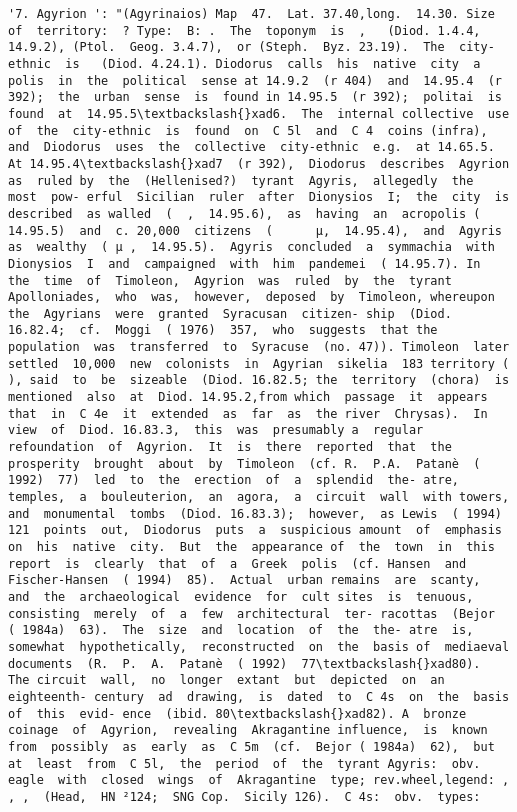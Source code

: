 \documentclass[11pt]{article}
\begin{document}
\begin{Verbatim}[commandchars=\\\{\}]
         '7. Agyrion ': "(Agyrinaios) Map  47.  Lat. 37.40,long.  14.30. Size of  territory:  ? Type:  B: .  The  toponym  is  ,   (Diod. 1.4.4,  14.9.2), (Ptol.  Geog. 3.4.7),  or (Steph.  Byz. 23.19).  The  city-ethnic  is   (Diod. 4.24.1). Diodorus  calls  his  native  city  a  polis  in  the  political  sense at 14.9.2  (r 404)  and  14.95.4  (r 392);  the  urban  sense  is  found in 14.95.5  (r 392);  politai  is  found  at  14.95.5\textbackslash{}xad6.  The  internal collective  use  of  the  city-ethnic  is  found  on  C 5l  and  C 4  coins (infra),  and  Diodorus  uses  the  collective  city-ethnic  e.g.  at 14.65.5. At 14.95.4\textbackslash{}xad7  (r 392),  Diodorus  describes  Agyrion  as  ruled by  the  (Hellenised?)  tyrant  Agyris,  allegedly  the  most  pow- erful  Sicilian  ruler  after  Dionysios  I;  the  city  is  described  as walled  (  ,  14.95.6),  as  having  an  acropolis ( 14.95.5)  and  c. 20,000  citizens  (      µ,  14.95.4),  and  Agyris  as  wealthy  ( µ ,  14.95.5).  Agyris  concluded  a  symmachia  with Dionysios  I  and  campaigned  with  him  pandemei  ( 14.95.7). In  the  time  of  Timoleon,  Agyrion  was  ruled  by  the  tyrant Apolloniades,  who  was,  however,  deposed  by  Timoleon, whereupon  the  Agyrians  were  granted  Syracusan  citizen- ship  (Diod. 16.82.4;  cf.  Moggi  ( 1976)  357,  who  suggests  that the  population  was  transferred  to  Syracuse  (no. 47)). Timoleon  later  settled  10,000  new  colonists  in  Agyrian  sikelia  183 territory ( ), said  to  be  sizeable  (Diod. 16.82.5; the  territory  (chora)  is  mentioned  also  at  Diod. 14.95.2,from which  passage  it  appears  that  in  C 4e  it  extended  as  far  as  the river  Chrysas).  In  view  of  Diod. 16.83.3,  this  was  presumably a  regular  refoundation  of  Agyrion.  It  is  there  reported  that  the  prosperity  brought  about  by  Timoleon  (cf. R.  P.A.  Patanè  ( 1992)  77)  led  to  the  erection  of  a  splendid  the- atre,  temples,  a  bouleuterion,  an  agora,  a  circuit  wall  with towers,  and  monumental  tombs  (Diod. 16.83.3);  however,  as Lewis  ( 1994)  121  points  out,  Diodorus  puts  a  suspicious amount  of  emphasis  on  his  native  city.  But  the  appearance of  the  town  in  this  report  is  clearly  that  of  a  Greek  polis  (cf. Hansen  and  Fischer-Hansen  ( 1994)  85).  Actual  urban remains  are  scanty,  and  the  archaeological  evidence  for  cult sites  is  tenuous,  consisting  merely  of  a  few  architectural  ter- racottas  (Bejor  ( 1984a)  63).  The  size  and  location  of  the  the- atre  is,  somewhat  hypothetically,  reconstructed  on  the  basis of  mediaeval  documents  (R.  P.  A.  Patanè  ( 1992)  77\textbackslash{}xad80).  The circuit  wall,  no  longer  extant  but  depicted  on  an  eighteenth- century  ad  drawing,  is  dated  to  C 4s  on  the  basis  of  this  evid- ence  (ibid. 80\textbackslash{}xad82). A  bronze  coinage  of  Agyrion,  revealing  Akragantine influence,  is  known  from  possibly  as  early  as  C 5m  (cf.  Bejor ( 1984a)  62),  but  at  least  from  C 5l,  the  period  of  the  tyrant Agyris:  obv.  eagle  with  closed  wings  of  Akragantine  type; rev.wheel,legend: ,  , ,  (Head,  HN ²124;  SNG Cop.  Sicily 126).  C 4s:  obv.  types:  
\end{Verbatim}
\end{document}
